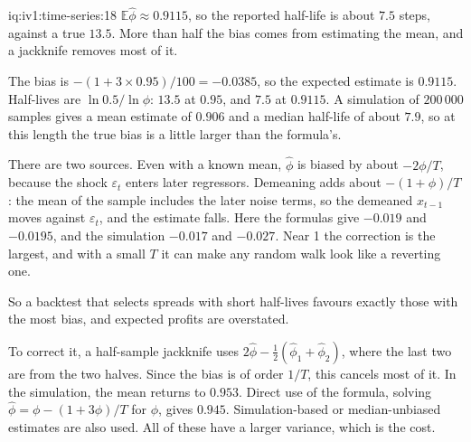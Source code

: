 \begin{solution}{iq:iv1:time-series:18}
$\mathbb{E}\hat{\phi} \approx 0.9115$, so the reported half-life is about $7.5$ steps, against a true $13.5$. More than half the bias comes from estimating the mean, and a jackknife removes most of it.

The bias is $-(1 + 3 \times 0.95)/100 = -0.0385$, so the expected estimate is $0.9115$. Half-lives are $\ln 0.5/\ln\phi$: $13.5$ at $0.95$, and $7.5$ at $0.9115$. A simulation of $200\,000$ samples gives a mean estimate of $0.906$ and a median half-life of about $7.9$, so at this length the true bias is a little larger than the formula's.

There are two sources. Even with a known mean, $\hat{\phi}$ is biased by about $-2\phi/T$, because the shock $\varepsilon_t$ enters later regressors. Demeaning adds about $-(1 + \phi)/T$: the mean of the sample includes the later noise terms, so the demeaned $x_{t - 1}$ moves against $\varepsilon_t$, and the estimate falls. Here the formulas give $-0.019$ and $-0.0195$, and the simulation $-0.017$ and $-0.027$. Near 1 the correction is the largest, and with a small $T$ it can make any random walk look like a reverting one.

So a backtest that selects spreads with short half-lives favours exactly those with the most bias, and expected profits are overstated.

To correct it, a half-sample jackknife uses $2\hat{\phi} - \frac12(\hat{\phi}_1 + \hat{\phi}_2)$, where the last two are from the two halves. Since the bias is of order $1/T$, this cancels most of it. In the simulation, the mean returns to $0.953$. Direct use of the formula, solving $\hat{\phi} = \phi - (1 + 3\phi)/T$ for $\phi$, gives $0.945$. Simulation-based or median-unbiased estimates are also used. All of these have a larger variance, which is the cost.



\end{solution}

